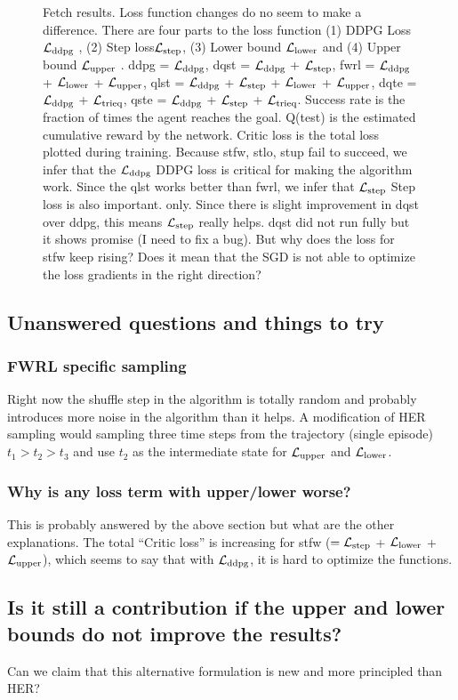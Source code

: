 \begin{figure}
  \caption{
    Fetch results. Loss function changes do no seem to make a difference.
    There are four parts to the loss function (1) DDPG Loss $\mathcal{L}_{\text{ddpg}}$ ,
    (2) Step loss$\mathcal{L}_{\text{step}}$,  
    (3) Lower bound $\mathcal{L}_{\text{lower}}$ and
    (4) Upper bound $\mathcal{L}_{\text{upper}}$ .
    ddpg = $\mathcal{L}_{\text{ddpg}}$,
    dqst = $\mathcal{L}_{\text{ddpg}}$ + $\mathcal{L}_{\text{step}}$,
    fwrl = $\mathcal{L}_{\text{ddpg}}$ + $\mathcal{L}_{\text{lower}}$ +
    $\mathcal{L}_{\text{upper}}$,
    qlst = $\mathcal{L}_{\text{ddpg}}$ + $\mathcal{L}_{\text{step}}$ + $\mathcal{L}_{\text{lower}}$ + $\mathcal{L}_{\text{upper}}$,
    dqte = $\mathcal{L}_{\text{ddpg}}$ + $\mathcal{L}_{\text{trieq}}$,
    qste = $\mathcal{L}_{\text{ddpg}}$ + $\mathcal{L}_{\text{step}}$ + $\mathcal{L}_{\text{trieq}}$.
    Success rate is the fraction of times the agent reaches the goal. Q(test) is
    the estimated cumulative reward by the network. Critic loss is the total
    loss plotted during training.
    Because stfw, stlo, stup fail to succeed, we infer that the $\mathcal{L}_{\text{ddpg}}$ DDPG loss is
    critical for making the algorithm work. Since the qlst works better than
    fwrl, we infer that $\mathcal{L}_{\text{step}}$ Step loss is also important.
    only.
    Since there is slight improvement in dqst over ddpg, this means
    $\mathcal{L}_{\text{step}}$ really helps. dqst did not run fully but it shows
    promise (I need to fix a bug).
    But why does the loss for stfw keep rising? Does it mean that the SGD is not
    able to optimize the loss gradients in the right direction?
  }%
  \label{fig:fwrl-stepfwrl-noop-FetchPush}%
\end{figure}%
% 


\subsection{Unanswered questions and things to try}

\subsubsection{FWRL specific sampling}
Right now the shuffle step in the algorithm is totally random and probably
introduces more noise in the algorithm than it helps. A modification of HER
sampling would sampling three time steps from the trajectory (single episode)
$t_1 > t_2 > t_3$ and use $t_2$ as the intermediate state for
$\mathcal{L}_{\text{upper}}$ and $\mathcal{L}_{\text{lower}}$.


\subsubsection{Why is any loss term with upper/lower worse?}
This is probably answered by  the above section but what are the other
explanations. The total ``Critic loss'' is increasing for stfw
($=\mathcal{L}_{\text{step}}$ + $\mathcal{L}_{\text{lower}}$ + $\mathcal{L}_{\text{upper}}$),
which seems to say that with $\mathcal{L}_{\text{ddpg}}$, it is hard to optimize the functions.


\subsection{Is it still a contribution if the upper and lower bounds do not
  improve the results?}
Can we claim that this alternative formulation is new and more principled than HER?
